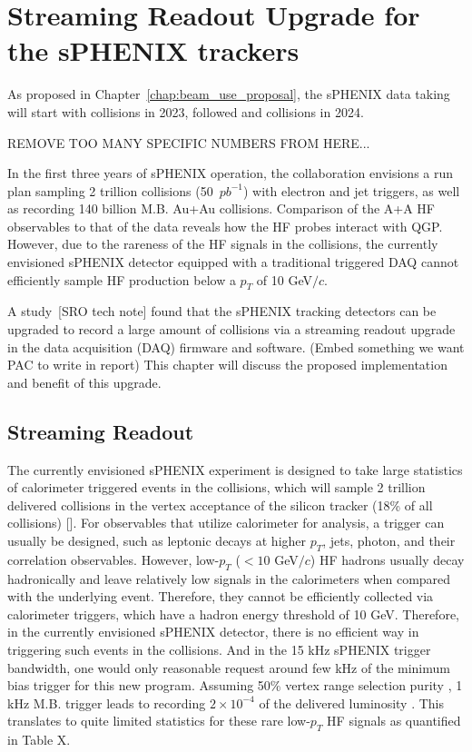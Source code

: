 
\section{Streaming Readout Upgrade for the sPHENIX trackers}
 
As proposed in Chapter~\ref{chap:beam_use_proposal}, the sPHENIX data taking will start with \auau collisions in 2023, followed \pp and \pau collisions in 2024.  

REMOVE TOO MANY SPECIFIC NUMBERS FROM HERE...

In the first three years of sPHENIX operation, the collaboration envisions a run plan sampling 2 trillion \pp collisions (50~$pb^{-1}$)  with electron and jet triggers, as well as recording 140 billion M.B. Au+Au collisions. Comparison of the A+A HF observables to that of the \pp data reveals how the HF probes interact with QGP. However, due to the rareness of the HF signals in the \pp collisions, the currently envisioned sPHENIX detector equipped with a traditional triggered  DAQ cannot efficiently sample HF production below a $p_T$ of 10 GeV$/c$. 
 
A study~[SRO tech note] found that the sPHENIX tracking detectors can be upgraded to record a large amount of \pp collisions via a streaming readout upgrade in the data acquisition (DAQ) firmware and software. 
(Embed something we want PAC to write in report) 
This chapter will discuss the proposed implementation and benefit of this upgrade. 
 

\subsection{Streaming Readout}
 
 The currently envisioned sPHENIX experiment is designed to take large statistics of calorimeter triggered events in the \pp collisions, which will sample 2 trillion delivered \pp collisions in the vertex acceptance of the silicon tracker (18\% of all collisions) []. For observables that utilize calorimeter for analysis, a trigger can usually be designed, such as leptonic decays at higher $p_T$, jets, photon, and their correlation observables. However, low-$p_T$  ($<10$ GeV$/c$) HF hadrons usually decay hadronically and leave relatively low signals in the calorimeters when compared with the underlying event. Therefore, they cannot be efficiently collected via calorimeter triggers, which have a hadron energy threshold of 10 GeV. Therefore, in the currently envisioned sPHENIX detector, there is no efficient way in triggering such events in the \pp collisions. And in the 15 kHz sPHENIX trigger bandwidth, one would only reasonable request around few kHz of the minimum bias \pp trigger for this new program. Assuming 50\% vertex range selection purity , 1 kHz M.B. trigger leads to recording $2\times10^{-4}$ of the delivered luminosity . This translates to quite limited statistics for these rare low-$p_T$ HF signals as quantified in Table X.
 
